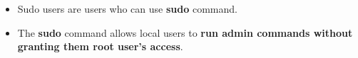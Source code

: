 \setlength{\columnsep}{3pt}
\begin{flushleft}
	
	\begin{itemize}
		\item Sudo users are users who can use \textbf{sudo} command.
		\item The \textbf{sudo} command allows local users to \textbf{run admin commands without granting them root user's access}.

	\end{itemize}

	
	
	
	
\end{flushleft}



